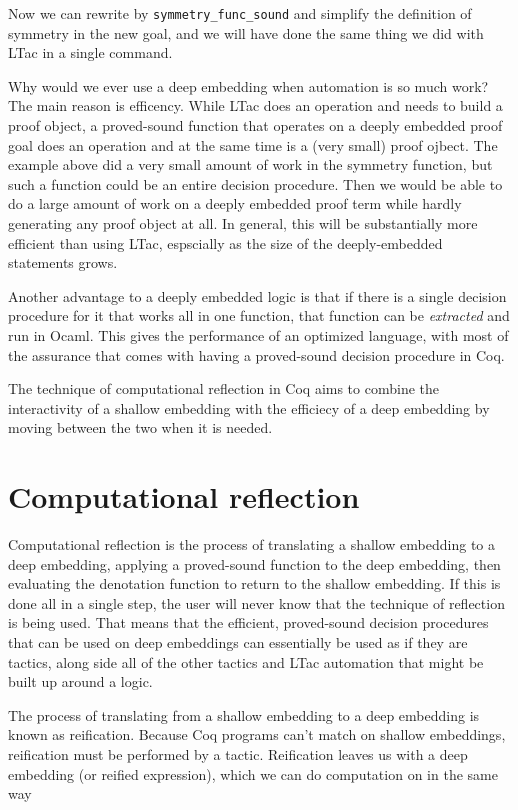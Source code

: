 \documentclass{puthesis}
\begin{document}
Now we can rewrite by \lstinline|symmetry_func_sound| and simplify the definition
of symmetry in the new goal, and we will have done the same thing we
did with LTac in a single command.

Why would we ever use a deep embedding when automation is so much
work? The main reason is efficency. While LTac does an operation and
needs to build a proof object, a proved-sound function that operates on
a deeply embedded proof goal does an operation and at the same time is
a (very small) proof ojbect. The example above did a very small amount
of work in the symmetry function, but such a function could be an
entire decision procedure. Then we would be able to do a large
amount of work on a deeply embedded proof term while hardly generating
any proof object at all. In general, this will be substantially more
efficient than using LTac, espscially as the size of the
deeply-embedded statements grows. 

Another advantage to a deeply embedded logic is that if there is a
single decision procedure for it that works all in one function, that
function can be \emph{extracted} and run in Ocaml. This gives the
performance of an optimized language, with most of the assurance that
comes with having a proved-sound decision procedure in Coq.

The technique of computational reflection in Coq aims to combine the
interactivity of a shallow embedding with the efficiecy of a deep
embedding by moving between the two when it is needed.

\section{Computational reflection}

Computational reflection is the process of translating a shallow
embedding to a deep embedding, applying a proved-sound function to the
deep embedding, then evaluating the denotation function to return to
the shallow embedding. If this is done all in a single step, the user
will never know that the technique of reflection is being used. That
means that the efficient, proved-sound decision procedures that can be
used on deep embeddings can essentially be used as if they are
tactics, along side all of the other tactics and LTac automation that
might be built up around a logic. 

The process of translating from a shallow embedding to a deep
embedding is known as reification. Because Coq programs can't match on
shallow embeddings, reification must be performed by a
tactic. Reification leaves us with a deep embedding (or reified
expression), which we can do computation on in the same way
\end{document}
